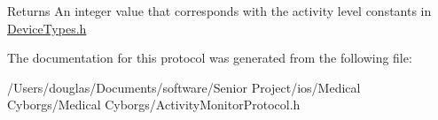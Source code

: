 \begin{DoxyReturn}{Returns}
An integer value that corresponds with the activity level constants in \hyperlink{_device_types_8h_source}{Device\-Types.\-h} 
\end{DoxyReturn}


The documentation for this protocol was generated from the following file\-:\begin{DoxyCompactItemize}
\item 
/\-Users/douglas/\-Documents/software/\-Senior Project/ios/\-Medical Cyborgs/\-Medical Cyborgs/Activity\-Monitor\-Protocol.\-h\end{DoxyCompactItemize}
